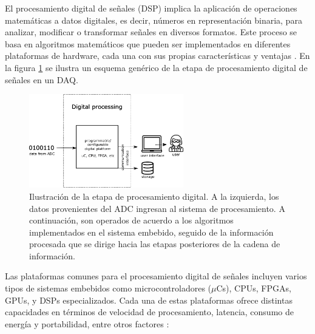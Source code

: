 \documentclass[]{book}
\begin{document}
\noindent El procesamiento digital de señales (DSP) implica la aplicación de operaciones matemáticas a datos digitales, es decir, números en representación binaria, para analizar, modificar o transformar señales en diversos formatos. Este proceso se basa en algoritmos matemáticos que pueden ser implementados en diferentes plataformas de hardware, cada una con sus propias características y ventajas \cite{proakis2007digital}. En la figura \ref{fig:digital_stage} se ilustra un esquema genérico de la etapa de procesamiento digital de señales en un DAQ.

\begin{figure}[h]
    \centering
    \includegraphics[width=0.6\textwidth]{digital_stage.png}
    \caption{Ilustración de la etapa de procesamiento digital. A la izquierda, los datos provenientes del ADC ingresan al sistema de procesamiento. A continuación, son operados de acuerdo a los algoritmos implementados en el sistema embebido, seguido de la información procesada que se dirige hacia las etapas posteriores de la cadena de información.}
    \label{fig:digital_stage}

\end{figure}


\noindent Las plataformas comunes para el procesamiento digital de señales incluyen varios tipos de sistemas embebidos como microcontroladores ($\mu$Cs), CPUs, FPGAs, GPUs, y DSPs especializados. Cada una de estas plataformas ofrece distintas capacidades en términos de velocidad de procesamiento, latencia, consumo de energía y portabilidad, entre otros factores \cite{meyer2007digital}:
\end{document}
